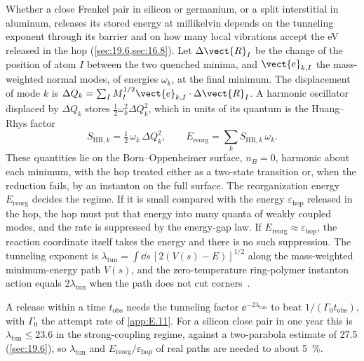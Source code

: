Whether a close Frenkel pair in silicon or germanium, or a split interstitial in aluminum, releases its stored energy at millikelvin depends on the tunneling exponent through its barrier and on how many local vibrations accept the eV released in the hop (\cref{sec:19.6,sec:16.8}). Let $\Delta\vect{R}_I$ be the change of the position of atom $I$ between the two quenched minima, and $\vect{e}_{k,I}$ the mass-weighted normal modes, of energies $\omega_k$, at the final minimum. The displacement of mode $k$ is $\Delta Q_k = \sum_I M_I^{1/2}\vect{e}_{k,I}\cdot\Delta\vect{R}_I$. A harmonic oscillator displaced by $\Delta Q_k$ stores $\tfrac12\omega_k^2\Delta Q_k^2$, which in units of its quantum is the Huang--Rhys factor~\cite{huang1950theory}
\begin{equation}
  S_{\mathrm{HR},k} = \tfrac12\,\omega_k\,\Delta Q_k^2 ,
  \qquad E_{\mathrm{reorg}} = \sum_k S_{\mathrm{HR},k}\,\omega_k .
  \label{eq:E.22-SHR}
\end{equation}
These quantities lie on the Born--Oppenheimer surface, $n_B = 0$, harmonic about each minimum, with the hop treated either as a two-state transition or, when the reduction fails, by an instanton on the full surface. The reorganization energy $E_{\mathrm{reorg}}$ decides the regime. If it is small compared with the energy $\varepsilon_{\mathrm{hop}}$ released in the hop, the hop must put that energy into many quanta of weakly coupled modes, and the rate is suppressed by the energy-gap law. If $E_{\mathrm{reorg}} \approx \varepsilon_{\mathrm{hop}}$, the reaction coordinate itself takes the energy and there is no such suppression. The tunneling exponent is $\lambda_{\mathrm{tun}} = \int\dd s\,[2(V(s) - E)]^{1/2}$ along the mass-weighted minimum-energy path $V(s)$, and the zero-temperature ring-polymer instanton action equals $2\lambda_{\mathrm{tun}}$ when the path does not cut corners~\cite{lawrence2024semiclassical}.

A release within a time $t_{\mathrm{obs}}$ needs the tunneling factor $\ee^{-2\lambda_{\mathrm{tun}}}$ to beat $1/(\varGamma_0t_{\mathrm{obs}})$, with $\varGamma_0$ the attempt rate of \cref{app:E.11}. For a silicon close pair in one year this is $\lambda_{\mathrm{tun}} \le 23.6$ in the strong-coupling regime, against a two-parabola estimate of 27.5 (\cref{sec:19.6}), so $\lambda_{\mathrm{tun}}$ and $E_{\mathrm{reorg}}/\varepsilon_{\mathrm{hop}}$ of real paths are needed to about \SI{5}{\percent}.

